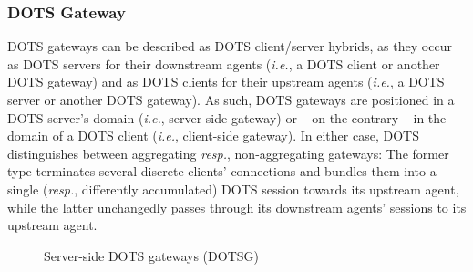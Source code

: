 \subsubsection{DOTS Gateway}
DOTS gateways can be described as DOTS client/server hybrids, as they occur as DOTS servers for their downstream agents (\emph{i.e.}, a DOTS client or another DOTS gateway) and as DOTS clients for their upstream agents (\emph{i.e.}, a DOTS server or another DOTS gateway). As such, DOTS gateways are positioned in a DOTS server's domain (\emph{i.e.}, server-side gateway) or -- on the contrary -- in the domain of a DOTS client (\emph{i.e.}, client-side gateway). In either case, DOTS distinguishes between aggregating \emph{resp.}, non-aggregating gateways: The former type terminates several discrete clients' connections and bundles them into a single (\emph{resp.}, differently accumulated) DOTS session towards its upstream agent, while the latter unchangedly passes through its downstream agents' sessions to its upstream agent.

\begin{figure}[H]
\centering
{}
\hfill
{} 
\caption{Server-side DOTS gateways (DOTSG) \cite{dots-architecture}}
\end{figure}

